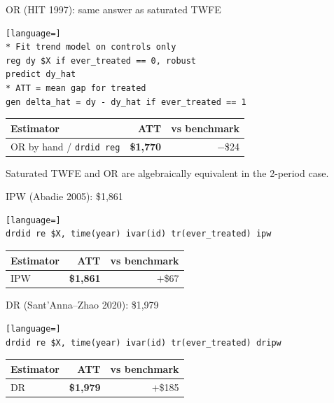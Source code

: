 \documentclass[aspectratio=169,11pt]{beamer}
\begin{document}
\begin{frame}[fragile]{OR (HIT 1997): same answer as saturated TWFE}
\vspace{0.3em}
\begin{lstlisting}[language=]
* Fit trend model on controls only
reg dy $X if ever_treated == 0, robust
predict dy_hat
* ATT = mean gap for treated
gen delta_hat = dy - dy_hat if ever_treated == 1
\end{lstlisting}
\vspace{0.4em}
\begin{center}
\begin{tabular}{lrr}
\toprule
Estimator & ATT & vs benchmark \\
\midrule
OR by hand / \texttt{drdid reg} & \textbf{\$1,770} & $-$\$24 \\
\bottomrule
\end{tabular}
\end{center}
\vspace{0.2em}
\begin{center}\color{warmgray}\small
Saturated TWFE and OR are algebraically equivalent in the 2-period case.
\end{center}
\end{frame}

\begin{frame}[fragile]{IPW (Abadie 2005): \$1,861}
\vspace{0.3em}
\begin{lstlisting}[language=]
drdid re $X, time(year) ivar(id) tr(ever_treated) ipw
\end{lstlisting}
\vspace{0.5em}
\begin{center}
\begin{tabular}{lrr}
\toprule
Estimator & ATT & vs benchmark \\
\midrule
IPW & \textbf{\$1,861} & $+$\$67 \\
\bottomrule
\end{tabular}
\end{center}
\end{frame}

\begin{frame}[fragile]{DR (Sant'Anna--Zhao 2020): \$1,979}
\vspace{0.3em}
\begin{lstlisting}[language=]
drdid re $X, time(year) ivar(id) tr(ever_treated) dripw
\end{lstlisting}
\vspace{0.5em}
\begin{center}
\begin{tabular}{lrr}
\toprule
Estimator & ATT & vs benchmark \\
\midrule
DR & \textbf{\$1,979} & $+$\$185 \\
\bottomrule
\end{tabular}
\end{center}
\end{frame}
\end{document}
